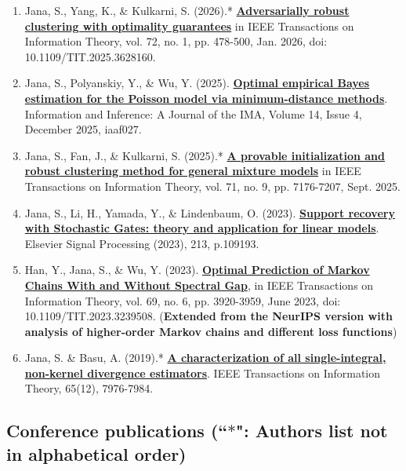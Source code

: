 \documentclass[letterpaper,12pt,oneside]{article}
\theoremstyle{definition}
\begin{document}
			\begin{enumerate}
				
				\item Jana, S., Yang, K., \& Kulkarni, S. (2026).* \href{https://arxiv.org/abs/2306.09977}{\bf Adversarially robust clustering with optimality guarantees} in IEEE Transactions on Information Theory, vol. 72, no. 1, pp. 478-500, Jan. 2026, doi: 10.1109/TIT.2025.3628160.
				
				
				\item Jana, S., Polyanskiy, Y., \& Wu, Y. (2025). {\bf \href{https://doi.org/10.1093/imaiai/iaaf027}{Optimal empirical Bayes estimation for the Poisson model via minimum-distance methods}}. Information and Inference: A Journal of the IMA, Volume 14, Issue 4, December 2025, iaaf027.
				
				\item Jana, S., Fan, J., \& Kulkarni, S. (2025).* {\bf \href{https://ieeexplore.ieee.org/document/11069307}{A provable initialization and robust clustering method for general mixture models}} in IEEE Transactions on Information Theory, vol. 71, no. 9, pp. 7176-7207, Sept. 2025.
				
				
				\item Jana, S., Li, H., Yamada, Y., \& Lindenbaum, O. (2023). {\bf \href{https://www.sciencedirect.com/science/article/abs/pii/S0165168423002670}{\bf Support recovery with Stochastic Gates: theory and application for linear models}}. Elsevier Signal Processing (2023), 213, p.109193.
				
				\item Han, Y., Jana, S., \& Wu, Y. (2023). \href{https://ieeexplore.ieee.org/abstract/document/10028667}{\bf Optimal Prediction of Markov Chains With and Without Spectral Gap}, in IEEE Transactions on Information Theory, vol. 69, no. 6, pp. 3920-3959, June 2023, doi: 10.1109/TIT.2023.3239508. (\textbf{Extended from the NeurIPS version with analysis of higher-order Markov chains and different loss functions})
				
				\item Jana, S. \& Basu, A. (2019).* \href{https://janasoham.github.io/files/bregman_charac.pdf}{\bf A characterization of all single-integral, non-kernel divergence estimators}. IEEE Transactions on Information Theory, 65(12), 7976-7984.
				
			\end{enumerate}
			
			\subsection*{Conference publications {\normalfont (``$\ast$": Authors list not in alphabetical order)}}
			
\end{document}
